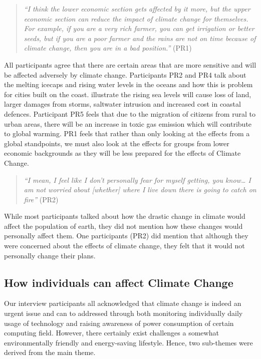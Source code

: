     \begin{quote}
        \textit{“I think the lower economic section gets affected by it more, but the upper economic section can reduce the impact of climate change for themselves. For example, if you are a very rich farmer, you can get irrigation or better seeds, but if you are a poor farmer and the rains are not on time because of climate change, then you are in a bad position.”} (PR1)
    \end{quote}

    All participants agree that there are certain areas that are more sensitive and will be affected adversely by climate change. Participants PR2 and PR4 talk about the melting icecaps and rising water levels in the oceans and how this is problem for cities built on the coast. \citet{hitz2004estimating} illustrate the rising sea levels will cause loss of land, larger damages from storms, saltwater intrusion and increased cost in coastal defences. Participant PR5 feels that due to the migration of citizens from rural to urban areas, there will be an increase in toxic gas emission which will contribute to global warming. PR1 feels that rather than only looking at the effects from a global standpoints, we must also look at the effects for groups from lower economic backgrounds as they will be less prepared for the effects of Climate Change.
    
    \begin{quote}
        \textit{“I mean, I feel like I don’t personally fear for myself getting, you know… I am not worried about [whether] where I live down there is going to catch on fire”} (PR2)
    \end{quote}

    While most participants talked about how the drastic change in climate would affect the population of earth, they did not mention how these changes would personally affect them. One participants (PR2) did mention that although they were concerned about the effects of climate change, they felt that it would not personally change their plans.
    \subsection{How individuals can affect Climate Change}
    
    Our interview participants all acknowledged that climate change is indeed an urgent issue and can to addressed through both monitoring individually daily usage of technology and raising awareness of power consumption of certain computing field. However, there certainly exist challenges a somewhat environmentally friendly and energy-saving lifestyle. Hence, two sub-themes were derived from the main theme.
    

